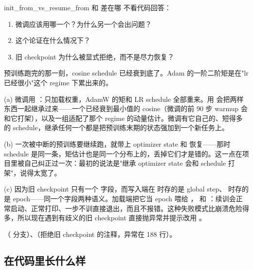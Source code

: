 \begin{checkpoint}{init_from_vs_resume_from}{ 和  差在哪}
不看代码回答：
\begin{enumerate}[label=(\alph*)]
  \item 微调应该用哪一个？为什么另一个会出问题？
  \item 这个论证在什么情况下？
  \item 旧 checkpoint 为什么被显式拒绝，而不是尽力恢复？
\end{enumerate}
\hint 预训练跑完的那一刻，cosine schedule 已经衰到底了。Adam 的一阶二阶矩是在"lr 已经很小"这个 regime 下累出来的。

\ifshowanswers
\tcblower
\answer (a) 微调用 ：只加载权重，AdamW 的矩和 LR schedule 全部重来。用  会把两样东西一起继承过来——一个已经衰到最小值的 cosine（微调的前 90 步 warmup 会和它打架），以及一组适配了那个 regime 的动量估计。微调有它自己的、短得多的 schedule，继承任何一个都是把预训练末期的状态强加到一个新任务上。

(b)  一次被中断的预训练要继续跑，就带上 optimizer state 和  恢复——那时 schedule 是同一条，矩估计也是同一个分布上的，丢掉它们才是错的。这一点在项目里被自己纠正过一次：最初的说法是"继承 optimizer state 会和 schedule 打架"，说得太宽了。

(c) 因为旧 checkpoint 只有一个  字段，而写入端在  时存的是 global step、 时存的是 epoch——同一个字段两种语义。加载端把它当 epoch 喂给 ， 和  ：续训会正常启动、正常打印、一步不训直接退出，而且不报错。这种失败模式比崩溃危险得多，所以现在遇到有歧义的旧 checkpoint 直接抛异常并提示改用 。

\whereincode {}（ 分支）、（拒绝旧 checkpoint 的注释，异常在 188 行）。
\fi
\end{checkpoint}

\subsection{ 在代码里长什么样}
\label{sec:b-sft-initfrom}

